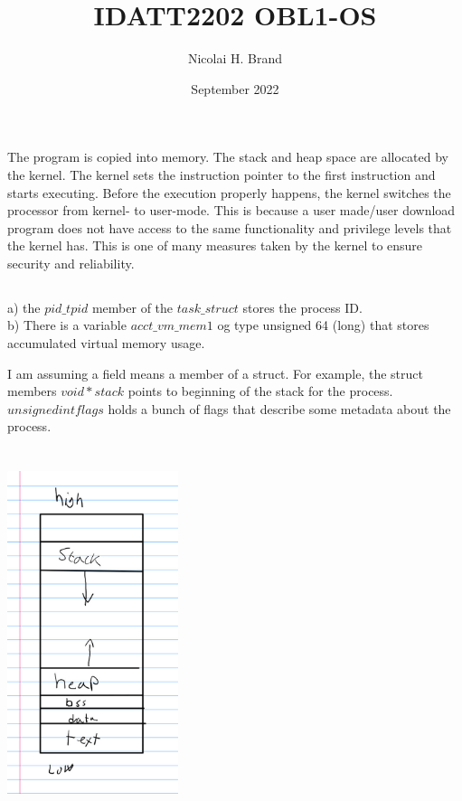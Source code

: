 \documentclass{article}
\title{IDATT2202 OBL1-OS}
\author{Nicolai H. Brand}
\date{September 2022}
\begin{document}
\maketitle

\section{}
\subsection{}
    The program is copied into memory. The stack and heap space are allocated by the kernel. The kernel sets the instruction pointer to the first instruction and starts executing. Before the execution properly happens, the kernel switches the processor from kernel- to user-mode. This is because a user made/user download program does not have access to the same functionality and privilege levels that the kernel has. This is one of many measures taken by the kernel to ensure security and reliability. 

\subsection{}
    a) the $pid\_t pid$ member of the $task\_struct$ stores the process ID.\\
    b) There is a variable $acct\_vm\_mem1$ og type unsigned 64 (long) that stores accumulated virtual memory usage.
    
    I am assuming a field means a member of a struct. For example, the struct members $void *stack$ points to beginning of the stack for the process. $unsigned int flags$ holds a bunch of flags that describe some metadata about the process. 

\section{}
\subsection{}
\includegraphics[width=50mm,scale=0.5]{address_space.jpg}
\end{document}
